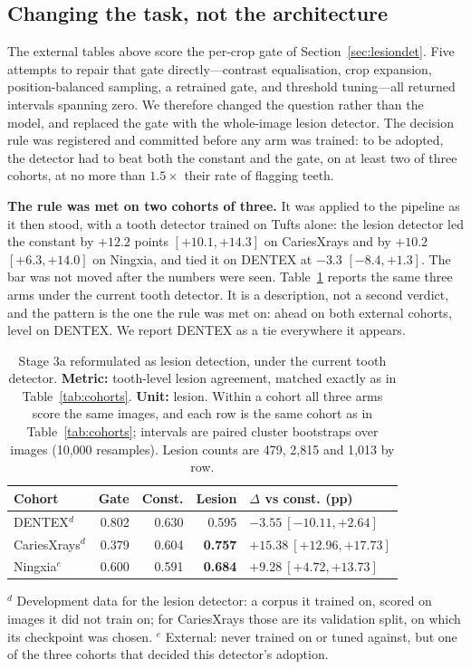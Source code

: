 \documentclass[conference]{IEEEtran}
\begin{document}
\subsection{Changing the task, not the architecture}
\label{sec:leverb}

The external tables above score the per-crop gate of Section~\ref{sec:lesiondet}.
Five attempts to repair that gate directly---contrast equalisation, crop
expansion, position-balanced sampling, a retrained gate, and threshold
tuning---all returned intervals spanning zero. We therefore changed the question
rather than the model, and replaced the gate with the whole-image lesion
detector. The decision rule was registered and committed before any arm was
trained: to be adopted, the detector had to beat both the constant and the gate,
on at least two of three cohorts, at no more than $1.5\times$ their rate of
flagging teeth.

\textbf{The rule was met on two cohorts of three.} It was applied to the pipeline
as it then stood, with a tooth detector trained on Tufts alone: the lesion
detector led the constant by $+12.2$ points $[+10.1, +14.3]$ on CariesXrays and by
$+10.2$ $[+6.3, +14.0]$ on Ningxia, and tied it on DENTEX at $-3.3$
$[-8.4, +1.3]$. The bar was not moved after the numbers were seen.
Table~\ref{tab:leverb} reports the same three arms under the current tooth
detector. It is a description, not a second verdict, and the pattern is the one
the rule was met on: ahead on both external cohorts, level on DENTEX. We report
DENTEX as a tie everywhere it appears.

\begin{table}[t]
\caption{Stage 3a reformulated as lesion detection, under the current tooth
detector. \textbf{Metric:} tooth-level lesion agreement, matched exactly as in
Table~\ref{tab:cohorts}. \textbf{Unit:} lesion. Within a cohort all three arms
score the same images, and each row is the same cohort as in
Table~\ref{tab:cohorts}; intervals are paired cluster bootstraps over images
(10{,}000 resamples). Lesion counts are 479, 2{,}815 and 1{,}013 by row.}
\label{tab:leverb}
\centering
\footnotesize
\setlength{\tabcolsep}{3pt}
\begin{tabular}{lrrrl}
\toprule
Cohort & Gate & Const. & Lesion & $\Delta$ vs const. (pp) \\
\midrule
DENTEX$^{d}$      & 0.802 & 0.630 & 0.595 & $-3.55\ [-10.11, +2.64]$ \\
CariesXrays$^{d}$ & 0.379 & 0.604 & \textbf{0.757} & $\mathbf{+15.38\ [+12.96, +17.73]}$ \\
Ningxia$^{e}$     & 0.600 & 0.591 & \textbf{0.684} & $\mathbf{+9.28\ [+4.72, +13.73]}$ \\
\bottomrule
\end{tabular}

\vspace{2pt}
\raggedright\footnotesize
$^{d}$ Development data for the lesion detector: a corpus it trained on, scored on
images it did not train on; for CariesXrays those are its validation split, on which
its checkpoint was chosen. $^{e}$ External: never trained on or tuned against, but one
of the three cohorts that decided this detector's adoption.
\end{table}
\end{document}
